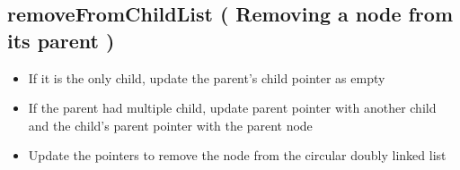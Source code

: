 \subsection{removeFromChildList ( Removing a node from its parent )}
		\begin{itemize}
			\item If it is the only child, update the parent's child pointer as empty
			\item If the parent had multiple child, update parent pointer with another child and the child's parent pointer with the parent node
			\item Update the pointers to remove the node from the circular doubly linked list
		\end{itemize}

